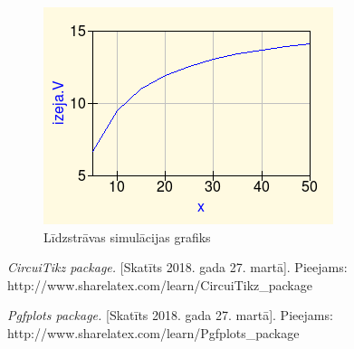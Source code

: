 \documentclass{report}
\begin{document}
\begin{figure}[h]
\centering
 \includegraphics[width=\textwidth, height=\textheight, keepaspectratio]{sprieguma_grafiks.png}
    \caption{Līdzstrāvas simulācijas grafiks}
    \label{fig:2.5}
\end{figure}
\label{s_nobeigums}

\begin{thebibliography}{9}
\textit{CircuiTikz package.} [Skatīts 2018. gada 27. martā].
Pieejams: http://www.sharelatex.com/learn/CircuiTikz\_{}package

\textit{Pgfplots package.} [Skatīts 2018. gada 27. martā].
Pieejams: http://www.sharelatex.com/learn/Pgfplots\_{}package
 
\end{thebibliography}
\end{document}
